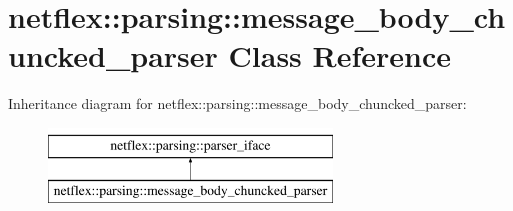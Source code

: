 \hypertarget{classnetflex_1_1parsing_1_1message__body__chuncked__parser}{}\section{netflex\+:\+:parsing\+:\+:message\+\_\+body\+\_\+chuncked\+\_\+parser Class Reference}
\label{classnetflex_1_1parsing_1_1message__body__chuncked__parser}
Inheritance diagram for netflex\+:\+:parsing\+:\+:message\+\_\+body\+\_\+chuncked\+\_\+parser\+:\begin{figure}[H]
\begin{center}
\leavevmode
\includegraphics[height=2.000000cm]{classnetflex_1_1parsing_1_1message__body__chuncked__parser}
\end{center}
\end{figure}
